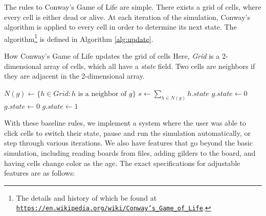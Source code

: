 \documentclass[onecolumn,12pt]{IEEEtran}
\begin{document}
  The rules to Conway's Game of Life are simple. There exists a grid of cells,
  where every cell is either dead or alive. At each iteration of the simulation,
  Conway's algorithm is applied to every cell in order to determine its next
  state. The algorithm\footnote{The details and history of which be found at
      \href{https://en.wikipedia.org/wiki/Conway's\_Game\_of\_Life}{\texttt{https://en.wikipedia.org/wiki/Conway's\_Game\_of\_Life}}.}
is defined in Algorithm \ref{alg:update}.

  \begin{algorithm}[t]
      \caption{How Conway's Game of Life updates the grid of cells
          Here, \textit{Grid} is a 2-dimensional array of cells, which all have
          a \textit{state} field. Two cells are neighbors if they are adjacent
      in the 2-dimensional array.}
      \begin{algorithmic}
          \State $N(g) \gets \{ h \in \textit{Grid} : \textrm{$h$ is a neighbor
          of $g$}\}$
          \State $s \gets \sum_{h \in N(g)} h.\textit{state}$
          \State $g.\textit{state} \gets 0$
          \Else
          \State $g.\textit{state} \gets 0$
          \Else 
          \State $g.\textit{state} \gets 1$
          \EndIf
          \EndIf
          \EndFor
          \EndFunction
      \end{algorithmic}
      \label{alg:update}
  \end{algorithm}

  With these baseline rules, we implement a system where the user was able to
  click cells to switch their state, pause and run the simulation
  automatically, or step through various iterations. We also have features that
  go beyond the basic simulation, including reading boards from files, adding
  gilders to the board, and having cells change color as the age. The exact
  specifications for adjustable features are as follows:
\end{document}
